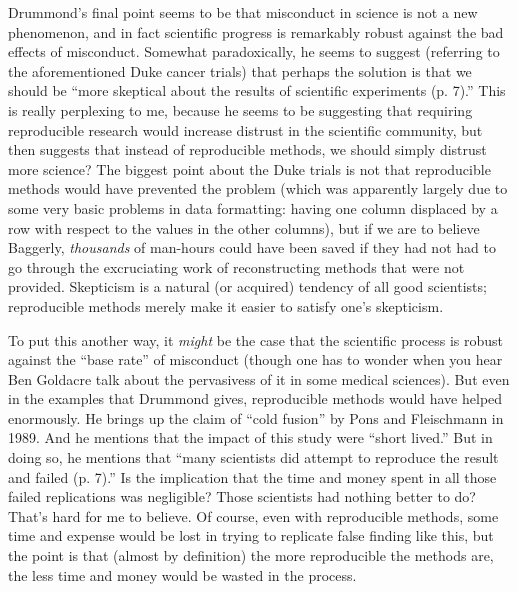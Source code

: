 \documentclass{book}
\begin{document}
Drummond's final point seems to be that misconduct in science is not a new phenomenon, and in fact scientific progress is remarkably robust against the bad effects of misconduct. Somewhat paradoxically, he seems to suggest (referring to the aforementioned Duke cancer trials) that perhaps the solution is that we should be ``more skeptical about the results of scientific experiments (p. 7).'' This is really perplexing to me, because he seems to be suggesting that requiring reproducible research would increase distrust in the scientific community, but then suggests that instead of reproducible methods, we should simply distrust more science? The biggest point about the Duke trials is not that reproducible methods would have prevented the problem (which was apparently largely due to some very basic problems in data formatting: having one column displaced by a row with respect to the values in the other columns), but if we are to believe Baggerly, \emph{thousands} of man-hours could have been saved if they had not had to go through the excruciating work of reconstructing methods that were not provided. Skepticism is a natural (or acquired) tendency of all good scientists; reproducible methods merely make it easier to satisfy one's skepticism.

To put this another way, it \emph{might} be the case that the scientific process is robust against the ``base rate'' of misconduct (though one has to wonder when you hear Ben Goldacre talk about the pervasivess of it in some medical sciences).  But even in the examples that Drummond gives, reproducible methods would have helped enormously. He brings up the claim of ``cold fusion'' by Pons and Fleischmann in 1989. And he mentions that the impact of this study were ``short lived.''  But in doing so, he mentions that ``many scientists did attempt to reproduce the result and failed (p. 7).'' Is the implication that the time and money spent in all those failed replications was negligible? Those scientists had nothing better to do? That's hard for me to believe. Of course, even with reproducible methods, some time and expense would be lost in trying to replicate false finding like this, but the point is that (almost by definition) the more reproducible the methods are, the less time and money would be wasted in the process.
\end{document}
